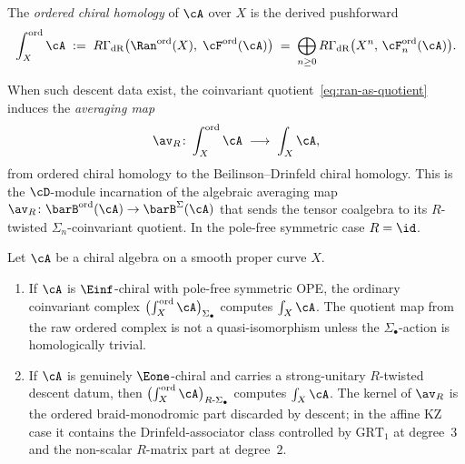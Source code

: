 \begin{definition}
\label{def:ordered-chiral-homology}
The \emph{ordered chiral homology} of $\cA$ over $X$ is the
derived pushforward
\begin{equation}\label{eq:ordered-chiral-homology}
\int_X^{\mathrm{ord}} \cA
\;:=\;
R\Gamma_{\mathrm{dR}}\bigl(
\Ran^{\mathrm{ord}}(X),\;
\cF^{\mathrm{ord}}(\cA)\bigr)
\;=\;
\bigoplus_{n \ge 0}
R\Gamma_{\mathrm{dR}}\bigl(X^n,\,
\cF^{\mathrm{ord}}_n(\cA)\bigr).
\end{equation}
\end{definition}

When such descent data exist, the coinvariant
quotient~\eqref{eq:ran-as-quotient} induces the \emph{averaging map}
\begin{equation}\label{eq:ordered-descent}
\av_R \colon
\int_X^{\mathrm{ord}} \cA
\;\longrightarrow\;
\int_X \cA,
\end{equation}
from ordered chiral homology to the Beilinson--Drinfeld chiral
homology. This is the $\cD$-module incarnation of the algebraic
averaging map $\av_R \colon \barB^{\mathrm{ord}}(\cA)
\to \barB^\Sigma(\cA)$ that sends the tensor coalgebra to its
$R$-twisted $\Sigma_n$-coinvariant quotient. In the pole-free
symmetric case $R=\id$.

\begin{proposition}
\label{prop:symmetric-descent-e1mkd}%
\ClaimStatusProvedHere
{}
Let $\cA$ be a chiral algebra on a smooth proper curve $X$.
\begin{enumerate}[label=\textup{(\roman*)}]
\item If $\cA$ is $\Einf$-chiral with pole-free symmetric OPE, the
 ordinary coinvariant complex
 $\bigl(\int_X^{\mathrm{ord}}\cA\bigr)_{\Sigma_\bullet}$ computes
 $\int_X\cA$. The quotient map from the raw ordered complex is not a
 quasi-isomorphism unless the $\Sigma_\bullet$-action is homologically
 trivial.
\item If $\cA$ is genuinely $\Eone$-chiral and carries a
 strong-unitary $R$-twisted descent datum, then
 $\bigl(\int_X^{\mathrm{ord}}\cA\bigr)_{R\text{-}\Sigma_\bullet}$
 computes $\int_X\cA$. The kernel of $\av_R$ is the ordered
 braid-monodromic part discarded by descent; in the affine KZ case it
 contains the Drinfeld-associator class controlled by
 $\mathrm{GRT}_1$ at degree~$3$ and the non-scalar $R$-matrix part at
 degree~$2$.
\end{enumerate}
\end{proposition}

